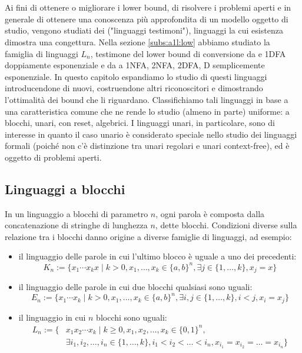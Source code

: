 \chapter{}
Ai fini di ottenere o migliorare i lower bound, di risolvere i problemi aperti e in generale di ottenere una conoscenza più approfondita di un modello oggetto di studio, vengono studiati dei  ("linguaggi testimoni"), linguaggi la cui esistenza dimostra una congettura. Nella sezione \ref{subs:a1l:low} abbiamo studiato la famiglia di linguaggi $L_n$, testimone del lower bound di conversione da  e 1DFA doppiamente esponenziale e da  a 1NFA, 2NFA, 2DFA, D semplicemente esponenziale. In questo capitolo espandiamo lo studio di questi linguaggi introducendone di nuovi, costruendone altri riconoscitori e dimostrando l'ottimalità dei bound che li riguardano. Classifichiamo tali linguaggi in base a una caratteristica comune che ne rende lo studio (almeno in parte) uniforme: a blocchi, unari, con reset, algebrici. I linguaggi unari, in particolare, sono di interesse in quanto il caso unario è considerato speciale nello studio dei linguaggi formali (poiché non c'è distinzione tra unari regolari e unari context-free), ed è oggetto di problemi aperti.



\section{Linguaggi a blocchi}\label{sec:wit:blk}
In un linguaggio a blocchi di parametro $n$, ogni parola è composta dalla concatenazione di stringhe di lunghezza $n$, dette blocchi. Condizioni diverse sulla relazione tra i blocchi danno origine a diverse famiglie di linguaggi, ad esempio:
\begin{itemize}
	\item il linguaggio delle parole in cui l'ultimo blocco è uguale a uno dei precedenti:
	      \begin{equation*}
		      K_n := \{ x_1\cdots x_kx \mid k>0, x_1,\dots,x_k\in\{a,b\}^n, \exists j\in\{1,\dots,k\},x_j=x\}
	      \end{equation*}
	\item il linguaggio delle parole in cui due blocchi qualsiasi sono uguali:
	      \begin{equation*}
		      E_n := \{x_1\cdots x_k \mid k>0, x_1,\dots,x_k\in\{a,b\}^n,\exists i,j\in\{1,\dots,k\},i<j,x_i=x_j\}
	      \end{equation*}
	\item il linguaggio in cui $n$ blocchi sono uguali:
	      \begin{align*}
		      L_n := \{ & x_1x_2\cdots x_k\mid k\geq0, x_1,x_2,\dots,x_k\in\{0,1\}^n,                                  \\
		                & \exists i_1,i_2,\dots,i_n\in\{1,\dots,k\},i_1<i_2<\dots<i_n, x_{i_1}=x_{i_2}=\dots=x_{i_n}\}
	      \end{align*}
\end{itemize}

